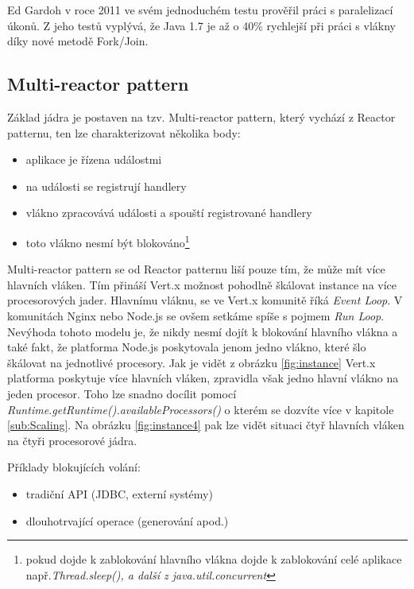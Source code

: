 Ed Gardoh v roce 2011 ve svém jednoduchém testu\cite{serialTest} prověřil práci s paralelizací úkonů. Z jeho testů vyplývá, že Java 1.7 je až o 40\% rychlejší při práci s vlákny díky nové metodě Fork/Join\cite{forkJoin}.

\subsection{Multi-reactor pattern}

Základ jádra je postaven na tzv. Multi-reactor pattern\cite{eventLoops}, který vychází z Reactor patternu\cite{reactorPattern}, ten lze charakterizovat několika body:

\begin{itemize}
\item{aplikace je řízena událostmi}
\item{na události se registrují handlery}
\item{vlákno zpracovává události a spouští registrované handlery}
\item{toto vlákno nesmí být blokováno\footnote{pokud dojde k zablokování hlavního vlákna dojde k zablokování celé aplikace např.\emph{Thread.sleep(), a další z java.util.concurrent }}}
\end{itemize}

Multi-reactor pattern\cite{eventLoops} se od Reactor patternu liší pouze tím, že může mít více hlavních vláken. Tím přináší Vert.x možnost pohodlně škálovat instance na více procesorových jader. Hlavnímu vláknu, se ve Vert.x komunitě říká \emph{Event Loop}. V komunitách Nginx nebo Node.js se ovšem setkáme spíše s pojmem \emph{Run Loop}. Nevýhoda tohoto modelu je, že nikdy nesmí dojít k blokování hlavního vlákna a také fakt, že platforma Node.js poskytovala jenom jedno vlákno, které šlo škálovat na jednotlivé procesory. Jak je vidět z obrázku \vref{fig:instance} Vert.x platforma poskytuje více hlavních vláken, zpravidla však jedno hlavní vlákno na jeden procesor. Toho lze snadno docílit pomocí \emph{Runtime.getRuntime().availableProcessors()} o kterém se dozvíte více v kapitole \ref{sub:Scaling}. Na obrázku \vref{fig:instance4} pak lze vidět situaci čtyř hlavních vláken na čtyři procesorové jádra.

Příklady blokujících volání:
\begin{itemize}
\item{tradiční API (JDBC, externí systémy)}
\item{dlouhotrvající operace (generování apod.)}
\end{itemize}


